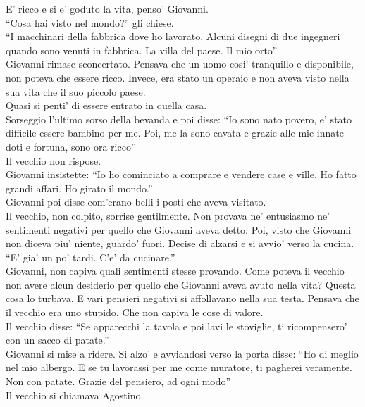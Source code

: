 E' ricco e si e' goduto la vita, penso' Giovanni.\\
\enquote{Cosa hai visto nel mondo?} gli chiese.\\
\enquote{I macchinari della fabbrica dove ho lavorato. Alcuni disegni di due ingegneri quando sono venuti in fabbrica. La villa del paese. Il mio orto}\\
Giovanni rimase sconcertato. Pensava che un uomo cosi' tranquillo e disponibile, non poteva che essere ricco. Invece, era stato un operaio e non aveva visto nella sua vita che il suo piccolo paese.\\
Quasi si penti' di essere entrato in quella casa.\\
Sorseggio l'ultimo sorso della bevanda e poi disse: \enquote{Io sono nato povero, e' stato difficile essere bambino per me. Poi, me la sono cavata e grazie alle mie innate doti e fortuna, sono ora ricco}\\
Il vecchio non rispose.\\
Giovanni insistette: \enquote{Io ho cominciato a comprare e vendere case e ville. Ho fatto grandi affari. Ho girato il mondo.}\\
Giovanni poi disse com'erano belli i posti che aveva visitato.\\
Il vecchio, non colpito, sorrise gentilmente. Non provava ne' entusiasmo ne' sentimenti negativi per quello che Giovanni aveva detto. Poi, visto che Giovanni non diceva piu' niente, guardo' fuori. Decise di alzarsi e si avvio' verso la cucina. \enquote{E' gia' un po' tardi. C'e' da cucinare.}\\

Giovanni, non capiva quali sentimenti stesse provando. Come poteva il vecchio non avere alcun desiderio per quello che Giovanni aveva avuto nella vita? Questa cosa lo turbava. E vari pensieri negativi si affollavano nella sua testa. Pensava che il vecchio era uno stupido. Che non capiva le cose di valore.\\

Il vecchio disse: \enquote{Se apparecchi la tavola e poi lavi le stoviglie, ti ricompensero' con un sacco di patate.}\\
Giovanni si mise a ridere. Si alzo' e avviandosi verso la porta disse: \enquote{Ho di meglio nel mio albergo. E se tu lavorassi per me come muratore, ti pagherei veramente. Non con patate. Grazie del pensiero, ad ogni modo}\\

Il vecchio si chiamava Agostino.\\

